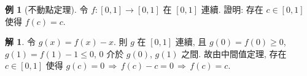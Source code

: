 \documentclass[12pt]{extarticle}
\newcommand{\ds}{\displaystyle}
\newcommand{\ie}{\,\Longrightarrow\,}
\theoremstyle{definition}
\newtheorem*{ex}{例}
\newtheorem*{sol}{解}
\begin{document}
\begin{ex}[不動點定理]
  令 $f:[0, 1]\to[0, 1]$ 在 $[0, 1]$ 連續. 證明: 存在 $c\in[0, 1]$ 使得 $\ds f(c) = c$. 
\end{ex}

\begin{sol}
  令 $g(x) = f(x) - x$. 則 $g$ 在 $[0, 1]$ 連續, 且 $g(0) = f(0)\geqslant 0$, $g(1) = f(1) - 1\leqslant 0$, $0$ 介於 $g(0)$, $g(1)$ 之間. 故由中間值定理, 存在 $c\in[0, 1]$ 使得 $\ds g(c) = 0 \ie f(c) - c = 0 \ie f(c) = c$. 
\end{sol}

%
%
\end{document}
